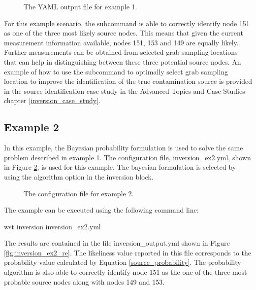\begin{figure}[!ht]
  \caption{The  YAML output file for example 1.}
  \label{fig:inversion_ex1_re}
\end{figure}

For this example scenario, the  subcommand is able to
correctly identify node 151 as one of the three most likely source
nodes. This means that given the current measurement information
available, nodes 151, 153 and 149 are equally likely. Further
measurements can be obtained from selected grab sampling locations that
can help in distinguishing between these three potential source
nodes. 
An example of how to use the  subcommand to
optimally select grab sampling location to improve the identification of the 
true contamination source is provided in the source identification case study 
in the Advanced Topics and Case Studies chapter \ref{inversion_case_study}.

\subsection{Example 2}  
In this example, the Bayesian probability formulation is used to solve
the same problem described in example 1. The configuration file,
inversion\_ex2.yml, shown in Figure \ref{fig:inversion_ex2}, is used for
this example. The bayesian formulation is selected
by using the algorithm option in the inversion
block.
 
\begin{figure}[!ht]
  \caption{The  configuration file for example 2.}
  \label{fig:inversion_ex2}
\end{figure}


The example can be executed using the following command line:
\begin{unknownListing}
wst inversion inversion_ex2.yml
\end{unknownListing}

The results are contained in the file {\outputprefix}inversion\_output.yml
shown in Figure \ref{fig:inversion_ex2_re}. The likeliness value
reported in this file corresponds to the probability value calculated
by Equation \ref{source_probability}. The probability algorithm is
also able to correctly identify node 151 as the one of the three most
probable source nodes along with nodes 149 and 153. 


